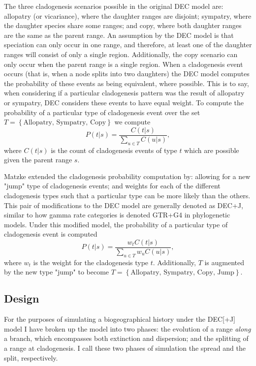\documentclass{article}
\begin{document}
The three cladogenesis scenarios possible in the original DEC model are:
allopatry (or vicariance), where the daughter ranges are disjoint; sympatry,
where the daughter species share some ranges; and copy, where both daughter
ranges are the same as the parent range.
An assumption by the DEC model is that speciation can only occur in one range,
and therefore, at least one of the daughter ranges will consist of only a
single region.
Additionally, the copy scenario can only occur when the parent range is a
single region.
When a cladogenesis event occurs (that is, when a node splits into two
daughters) the DEC model computes the probability of these events as being
equivalent, where possible.
This is to say, when considering if a particular cladogenesis pattern was the
result of allopatry or sympatry, DEC considers these events to have equal
weight.
To compute the probability of a particular type of cladogenesis event over the
set \(T = \left\{\text{Allopatry, Sympatry, Copy}\right\}\) we compute
\[
	P(t |
	s) = \frac{C(t | s)}{\sum_{u \in T} C(u | s)},
\]
where \( C(t|s) \) is the
count of cladogenesis events of type $ t $ which are possible given the parent
range \( s \).

Matzke\cite{ModelSelectionMatzke2014} extended the cladogenesis probability
computation by: allowing for a new "jump" type of cladogenesis events; and
weights for each of the different cladogenesis types such that a particular
type can be more likely than the others.
This pair of modifications to the DEC model are generally denoted as DEC+J,
similar to how gamma rate categories is denoted GTR+G4 in phylogenetic models.
Under this modified model, the probability of a particular type of cladogenesis
event is computed
\[
	P(t | s) = \frac{w_t C(t | s)}{\sum_{u \in T} w_u C(u |
		s)},
\]
where $w_t$ is the weight for the cladogenesis type $t$.
Additionally, $T$ is augmented by the new type "jump" to become \(T =
\left\{\text{Allopatry, Sympatry, Copy, Jump}\right\} \).

\subsection{Design}

For the purposes of simulating a biogeographical history under the DEC[+J]
model I have broken up the model into two phases: the evolution of a range
\textit{along} a branch, which encompasses both extinction and dispersion; and
the splitting of a range at cladogenesis.
I call these two phases of simulation the spread and the split, respectively.
\end{document}
